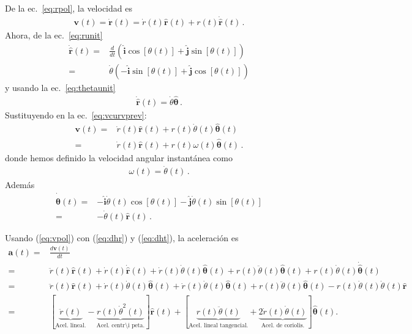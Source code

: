 De la ec.~\eqref{eq:rpol}, la velocidad es
\begin{align}
  \label{eq:vcurvprev}
  \mathbf{v}(t)=\dot{\mathbf{r}}(t)=\dot{r}(t)\hat{\mathbf{r}}(t)+
r(t)\dot{\hat{\mathbf{r}}}(t)\,.
\end{align}
Ahora, de la ec.~\eqref{eq:runit}
\begin{align}
  \dot{\hat{\mathbf{r}}}(t)=&\frac{d}{dt}\left(\hat{\mathbf{i}}\cos[\theta(t)]+\hat{\mathbf{j}}\sin[\theta(t)]\right)\nonumber\\
  =&\dot{\theta}
  \left(
    -\hat{\mathbf{i}}\sin[\theta(t)]+\hat{\mathbf{j}}\cos[\theta(t)]
  \right)
\end{align}
y usando la ec.~\eqref{eq:thetaunit}
\begin{align}
\label{eq:dhr}
\dot{\hat{\mathbf{r}}}(t)=\dot{\theta}\hat{\boldsymbol{\theta}}\,.
\end{align}
Sustituyendo en la ec.~\eqref{eq:vcurvprev}:
\begin{align}
  \label{eq:vpol}
  \mathbf{v}(t)=&\dot{r}(t)\hat{\mathbf{r}}(t)+r(t)\dot{\theta}(t)\hat{\boldsymbol{\theta}}(t)\nonumber\\
  =&\dot{r}(t)\hat{\mathbf{r}}(t)+r(t)\omega(t)\hat{\boldsymbol{\theta}}(t)\,.
\end{align}
donde hemos definido la velocidad angular instantánea como
\begin{align}
  \omega(t)=\dot\theta(t)\,.
\end{align}
Además
\begin{align}
\label{eq:dht}
  \dot{\hat{\boldsymbol{\theta}}}(t)=&
  -\hat{\mathbf{i}}\dot{\theta}(t)\cos[\theta(t)]-\hat{\mathbf{j}}\dot{\theta}(t)\sin[\theta(t)]\nonumber\\
  =&-\dot{\theta}(t)\hat{\mathbf{r}}(t)\,.
\end{align}

Usando (\ref{eq:vpol}) con (\ref{eq:dhr})  y (\ref{eq:dht}), la aceleraci\'on es %
\begin{align}
\label{eq:apol}
  \mathbf{a}(t)=&\frac{d\mathbf{v}(t)}{dt}\nonumber\\
=& \ddot{r}(t)\hat{\mathbf{r}}(t)+\dot{r}(t)\dot{\hat{\mathbf{r}}}(t)+\dot{r}(t)\dot{\theta}(t)\hat{\boldsymbol{\theta}}(t)
+r(t)\ddot{\theta}(t)\hat{\boldsymbol{\theta}}(t)
+r(t)\dot{\theta}(t)\dot{\hat{\boldsymbol{\theta}}}(t) \nonumber\\
=&
 \ddot{r}(t)\hat{\mathbf{r}}(t)+\dot{r}(t)\dot{\theta}(t)\hat{\boldsymbol{\theta}}(t)+\dot{r}(t)\dot{\theta}(t)\hat{\boldsymbol{\theta}}(t)
+r(t)\ddot{\theta}(t)\hat{\boldsymbol{\theta}}(t)
-r(t)\dot{\theta}(t)\dot{\theta}(t)\hat{\mathbf{r}} \nonumber\\
=&[\underbrace{\ddot{r}(t)}_{{\text{Acel. lineal.}}}
-\underbrace{r(t)\dot{\theta}^2(t)}_{{\text{Acel. centr\'\i peta.}}}]\hat{\mathbf{r}}(t)
+[\underbrace{r(t)\ddot{\theta}(t)}_{{\text{Acel. lineal tangencial.}}}
+\underbrace{2\dot{r}(t)\dot{\theta}(t)}_{{\text{Acel. de coriolis.}}}]\hat{\boldsymbol{\theta}}(t).
\end{align}

